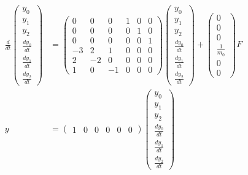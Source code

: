 \documentclass[a4paper,11pt,fleqn]{jreport}
\begin{document}
\begin{align}
 \frac{d}{dt} \left(\begin{array}{c}
	         y_0 \\
		     y_1 \\
		     y_2 \\
		     \frac{dy_0}{dt} \\
		     \frac{dy_1}{dt} \\
		     \frac{dy_2}{dt}
		    \end{array}\right)
 &=
 \left(\begin{array}{rrrrrr}
        0 & 0 & 0 & 1 & 0 & 0      \\
        0 & 0 & 0 & 0 & 1 & 0      \\
        0 & 0 & 0 & 0 & 0 & 1      \\
	-3& 2 & 1 & 0 & 0 & 0 \\
	2 & -2& 0 & 0 & 0 & 0 \\
	1 & 0 & -1& 0 & 0 & 0 
       \end{array}\right)
 \left(\begin{array}{c}
	         y_0 \\
		     y_1 \\
		     y_2 \\
		     \frac{dy_0}{dt} \\
		     \frac{dy_1}{dt} \\
		     \frac{dy_2}{dt}
       \end{array}\right)
 +
 \left(\begin{array}{c}
        0 \\
        0 \\
        0 \\
	    \frac{1}{m_0} \\
	    0 \\
	    0 
       \end{array}\right)
        F
\nonumber
\\
y &=
 \left(\begin{array}{cccccc}
         1 & 0 & 0 & 0 & 0 & 0
       \end{array}\right)
 \left(\begin{array}{c}
	         y_0 \\
		     y_1 \\
		     y_2 \\
		     \frac{dy_0}{dt} \\
		     \frac{dy_1}{dt} \\
		     \frac{dy_2}{dt}
       \end{array}\right)
\nonumber
\end{align}
\end{document}
